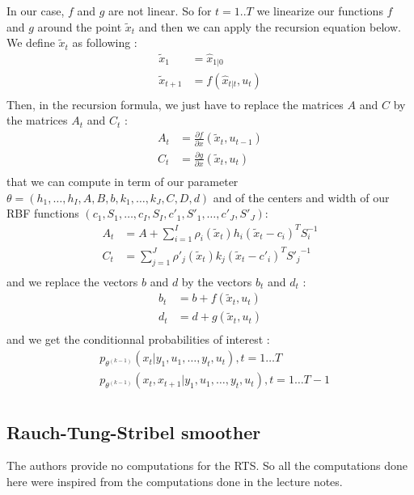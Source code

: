 In our case, $f$ and $g$ are not linear.
So for $t=1..T$ we linearize our functions $f$ and $g$ around the point $\tilde{x}_t$ and then we can apply the recursion equation below.
We define $\tilde{x}_t$ as following :
\begin{align*}
  \tilde{x}_1 &= \hat{x}_{1|0}\\
  \tilde{x}_{t+1} &= f(\hat{x}_{t|t}, u_t)\\
\end{align*}
Then, in the recursion formula, we just have to replace the matrices $A$ and $C$  by the matrices $A_t$ and $C_t$ :
\begin{align*}
  A_t &= \frac{\partial f}{\partial x}(\tilde{x}_t, u_{t-1})\\
  C_t &= \frac{\partial g}{\partial x}(\tilde{x}_t, u_t)\\
\end{align*}
that we can compute in term of our parameter $\theta = \left( h_1, \ldots , h_I, A, B, b, k_1, \ldots , k_J, C, D, d \right)$ and of the centers and width of our RBF functions $(c_1, S_1, \ldots ,c_I, S_I, c'_1, S'_1, \ldots , c'_J, S'_J)$:
\begin{align*}
  A_t &= A + \sum_{i=1}^I \rho_i(\tilde{x}_t) h_i (\tilde{x}_t - c_i)^T S_i^{-1}\\
  C_t &= \sum_{j=1}^J \rho'_j(\tilde{x}_t) k_j (\tilde{x}_t - c'_i)^T {S'_j}^{-1}\\
\end{align*}
and we replace the vectors $b$ and $d$ by the vectors $b_t$ and $d_t$ :
\begin{align*}
  b_t &= b + f(\tilde{x}_t, u_t)\\
  d_t &= d + g(\tilde{x}_t, u_t)\\
\end{align*}
and we get the conditionnal probabilities of interest :
\begin{align*}
  &p_{\theta^{(k-1)}}\left(x_t|y_1, u_1, \ldots, y_t, u_t \right ), t=1 \ldots T\\
  &p_{\theta^{(k-1)}}\left(x_t, x_{t+1}|y_1, u_1, \ldots, y_t, u_t \right ), t=1 \ldots T-1\\
\end{align*}

\subsection{Rauch-Tung-Stribel smoother}
The authors provide no computations for the RTS.
So all the computations done here were inspired from the computations done in the lecture notes.

